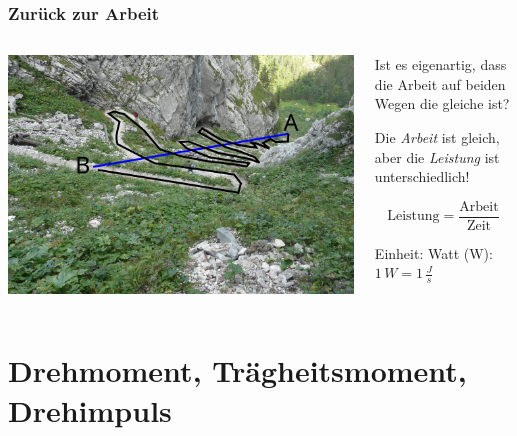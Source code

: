 \documentclass{beamer}
\begin{document}

\begin{frame}
\frametitle{Zurück zur Arbeit}

 
\begin{columns}[c]

\begin{column}{5cm}

\begin{center}
\includegraphics[width=\textwidth]{serpentine_anno.png}
\end{center}

\end{column}

\begin{column}{5cm}


Ist es eigenartig, dass die Arbeit auf beiden Wegen die gleiche ist? \pause

Die \emph{Arbeit} ist gleich, aber die \emph{Leistung} ist unterschiedlich! 

\[
\text{Leistung} = \frac{\text{Arbeit}}{\text{Zeit}}
\]

Einheit: Watt (W): \(1\,W = 1\,\frac{J}{s}\)
\end{column}



\end{columns}

\end{frame}


\section{Drehmoment, Trägheitsmoment, Drehimpuls}
\end{document}
